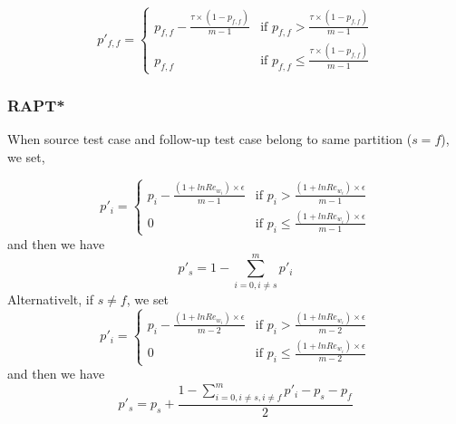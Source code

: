 \documentclass[10pt,journal,compsoc]{IEEEtran}
\begin{document}
\begin{equation}
\label{eq:MAPTNotKillOneNotSameFF}
p'_{f, f} =
\begin{cases}
p_{f, f} - \displaystyle\frac{\tau \times (1 - p_{f, f})}{m - 1} & \text{if } p_{f, f} > \displaystyle\frac{\tau \times (1 - p_{f, f})}{m - 1} \\
p_{f, f}                                                         & \text{if } p_{f, f} \leq \displaystyle\frac{\tau \times (1 - p_{f, f})}{m - 1}
\end{cases}
\end{equation}

\subsubsection{RAPT*}
\label{sec:rapt*}

When source test case and follow-up test case belong to same partition ($s = f$), we set,

\begin{equation}
\label{eq:RAPTKillOneSameI}
p'_i =
\begin{cases}
p_i - \displaystyle\frac{(1 + lnRe_{w_i}) \times \epsilon}{m - 1} & \text{if } p_i > \displaystyle\frac{(1 + lnRe_{w_i}) \times \epsilon}{m - 1} \\
0                                                                 & \text{if } p_i \leq \displaystyle\frac{(1 + lnRe_{w_i}) \times \epsilon}{m - 1}
\end{cases}
\end{equation}
and then we have
\begin{equation}
\label{eq:RAPTKillOneSameS}
p'_s = 1 - \sum\limits_{i = 0, i \ne s}^mp'_i
\end{equation}
Alternativelt, if $s \ne f$, we set
\begin{equation}
\label{eq:RAPTKillOneNotSameI}
p'_i =
\begin{cases}
p_i - \displaystyle\frac{(1 + lnRe_{w_i}) \times \epsilon}{m - 2} & \text{if } p_i > \displaystyle\frac{(1 + lnRe_{w_i}) \times \epsilon}{m - 2} \\
0                                                                 & \text{if } p_i \leq \displaystyle\frac{(1 + lnRe_{w_i}) \times \epsilon}{m - 2}
\end{cases}
\end{equation}
and then we have
\begin{equation}
\label{eq:RAPTKillOneNotSameS}
p'_s = p_s + \displaystyle\frac{1 - \sum\limits_{i = 0, i \ne s, i \ne f}^mp'_i - p_s - p_f}{2}
\end{equation}
\end{document}
